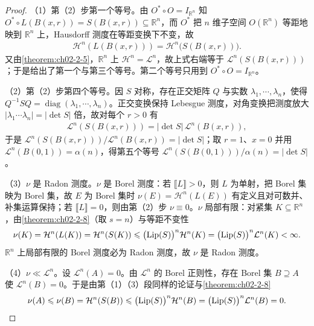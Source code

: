 \documentclass[../../main.tex]{subfiles}%
\begin{document}
\begin{proof}
（1）第（2）步第一个等号。由 $O^{*}\circ O=I_{\mathbb{R}^n}$ 知 $O^{*}\circ L(B(x,r))=S(B(x,r))\subseteq\mathbb{R}^n$，而 $O^{*}$ 把 $n$ 维子空间 $O(\mathbb{R}^n)$ 等距地映到 $\mathbb{R}^n$ 上，Hausdorff 测度在等距变换下不变，故
\begin{align*}
\mathcal{H}^n(L(B(x,r)))=\mathcal{H}^n\bigl(S(B(x,r))\bigr).
\end{align*}
又由\cref{theorem:ch02-2-5}，$\mathbb{R}^n$ 上 $\mathcal{H}^n=\mathcal{L}^n$，故上式右端等于 $\mathcal{L}^n(S(B(x,r)))$；于是给出了第一个与第三个等号。第二个等号只用到 $O^{*}\circ O=I_{\mathbb{R}^n}$。%

（2）第（2）步第四个等号。因 $S$ 对称，存在正交矩阵 $Q$ 与实数 $\lambda_1,\cdots,\lambda_n$，使得 $Q^{-1}SQ=\operatorname{diag}(\lambda_1,\cdots,\lambda_n)$。正交变换保持 Lebesgue 测度，对角变换把测度放大 $\lvert\lambda_1\cdots\lambda_n\rvert=\lvert\det S\rvert$ 倍，故对每个 $r>0$ 有
\begin{align*}
\mathcal{L}^n(S(B(x,r)))=\lvert\det S\rvert\,\mathcal{L}^n(B(x,r)),
\end{align*}
于是 $\mathcal{L}^n(S(B(x,r)))/\mathcal{L}^n(B(x,r))=\lvert\det S\rvert$；取 $r=1$、$x=0$ 并用 $\mathcal{L}^n(B(0,1))=\alpha(n)$，得第五个等号 $\mathcal{L}^n(S(B(0,1)))/\alpha(n)=\lvert\det S\rvert$。

（3）$\nu$ 是 Radon 测度。$\nu$ 是 Borel 测度：若 $\llbracket L\rrbracket>0$，则 $L$ 为单射，把 Borel 集映为 Borel 集，故 $E$ 为 Borel 集时 $\nu(E)=\mathcal{H}^n(L(E))$ 有定义且对可数并、补集运算保持；若 $\llbracket L\rrbracket=0$，则由第（2）步 $\nu\equiv0$。$\nu$ 局部有限：对紧集 $K\subseteq\mathbb{R}^n$，由\cref{theorem:ch02-2-8}（取 $s=n$）与等距不变性 %
\begin{align*}
\nu(K)=\mathcal{H}^n(L(K))=\mathcal{H}^n(S(K))\leqslant\bigl(\operatorname{Lip}(S)\bigr)^n\mathcal{H}^n(K)=\bigl(\operatorname{Lip}(S)\bigr)^n\mathcal{L}^n(K)<\infty .
\end{align*}
$\mathbb{R}^n$ 上局部有限的 Borel 测度必为 Radon 测度，故 $\nu$ 是 Radon 测度。%

（4）$\nu\ll\mathcal{L}^n$。设 $\mathcal{L}^n(A)=0$。由 $\mathcal{L}^n$ 的 Borel 正则性，存在 Borel 集 $B\supseteq A$ 使 $\mathcal{L}^n(B)=0$。于是由第（1）（3）段同样的论证与\cref{theorem:ch02-2-8} %
\begin{align*}
\nu(A)\leqslant\nu(B)=\mathcal{H}^n(S(B))\leqslant\bigl(\operatorname{Lip}(S)\bigr)^n\mathcal{H}^n(B)=\bigl(\operatorname{Lip}(S)\bigr)^n\mathcal{L}^n(B)=0 .
\end{align*}


\end{proof}
\end{document}
